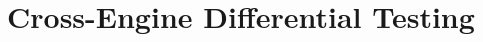 \documentclass[sigconf,review, anonymous]{acmart}
\begin{document}








\section{Cross-Engine Differential Testing}
\label{sec:design}
\end{document}
